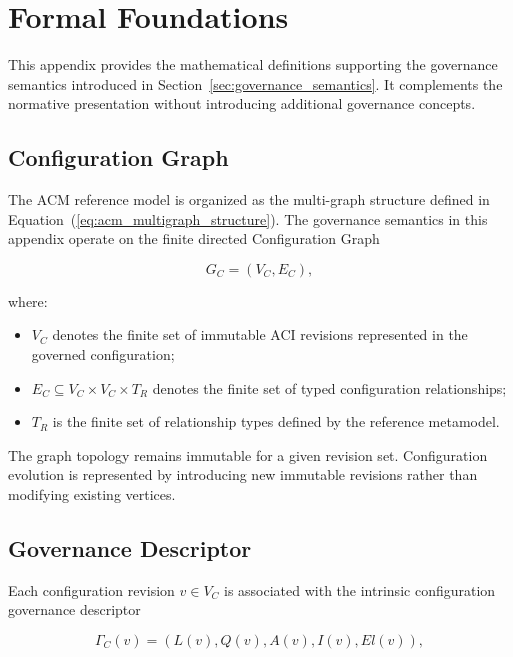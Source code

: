 \documentclass[10pt]{article}
\begin{document}
\section{Formal Foundations}
\label{appendix:formal_foundations}

This appendix provides the mathematical definitions supporting the governance semantics introduced in Section~\ref{sec:governance_semantics}. It complements the normative presentation without introducing additional governance concepts.

\subsection{Configuration Graph}
The ACM reference model is organized as the multi-graph structure defined in Equation~(\ref{eq:acm_multigraph_structure}). The governance semantics in this appendix operate on the finite directed Configuration Graph

\begin{equation}
	G_C=(V_C,E_C),
	\label{eq:graph_definition}
\end{equation}

where:

\begin{itemize}
	\item $V_C$ denotes the finite set of immutable ACI revisions represented in the governed configuration;
	\item $E_C\subseteq V_C\times V_C\times T_R$ denotes the finite set of typed configuration relationships;
	\item $T_R$ is the finite set of relationship types defined by the reference metamodel.
\end{itemize}
The graph topology remains immutable for a given revision set. Configuration evolution is represented by introducing new immutable revisions rather than modifying existing vertices.

\subsection{Governance Descriptor}

Each configuration revision $v\in V_C$ is associated with the intrinsic
configuration governance descriptor

\begin{equation}
	\Gamma_C(v)=
	\left(
	L(v),
	Q(v),
	A(v),
	I(v),
	El(v)
	\right),
	\label{eq:descriptor_definition}
\end{equation}
\end{document}
